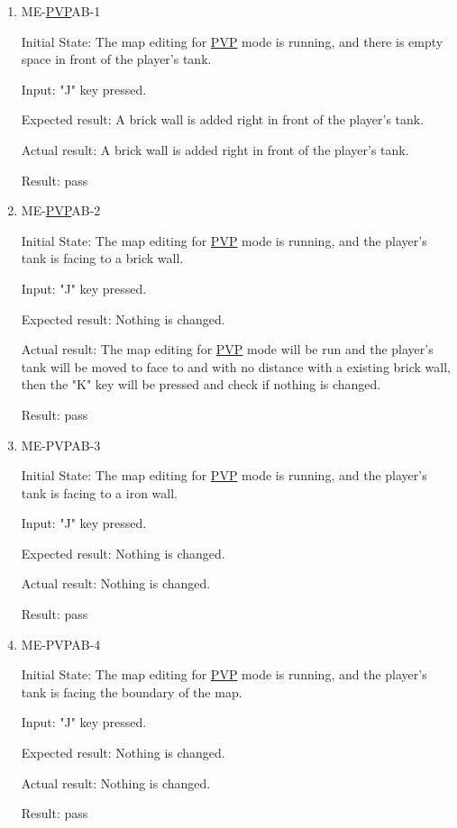 \documentclass[12pt, titlepage]{article}
\begin{document}
\begin{enumerate}

\item{ME-\underline{PVP}AB-1\\}
					
Initial State: The map editing for \underline{PVP} mode is running, and there is empty space in front of the player's tank.
					
Input: "J" key pressed.
					
Expected result: A brick wall is added right in front of the player's tank.
					
Actual result: A brick wall is added right in front of the player's tank.
					
Result: pass

\item{ME-\underline{PVP}AB-2\\}
					
Initial State: The map editing for \underline{PVP} mode is running, and the player's tank is facing to a brick wall.
					
Input: "J" key pressed.
					
Expected result: Nothing is changed.
					
Actual result: The map editing for \underline{PVP} mode will be run and the player's tank will be moved to face to and with no distance with a existing brick wall, then the "K" key will be pressed and check if nothing is changed.

Result: pass

\item{ME-PVPAB-3\\}
					
Initial State: The map editing for \underline{PVP} mode is running, and the player's tank is facing to a iron wall.
					
Input: "J" key pressed.
					
Expected result: Nothing is changed.
					
Actual result: Nothing is changed.

Result: pass

\item{ME-PVPAB-4\\}
					
Initial State: The map editing for \underline{PVP} mode is running, and the player's tank is facing the boundary of the map.
					
Input: "J" key pressed.
					
Expected result: Nothing is changed.
					
Actual result: Nothing is changed.

Result: pass

\end{enumerate}
\end{document}
